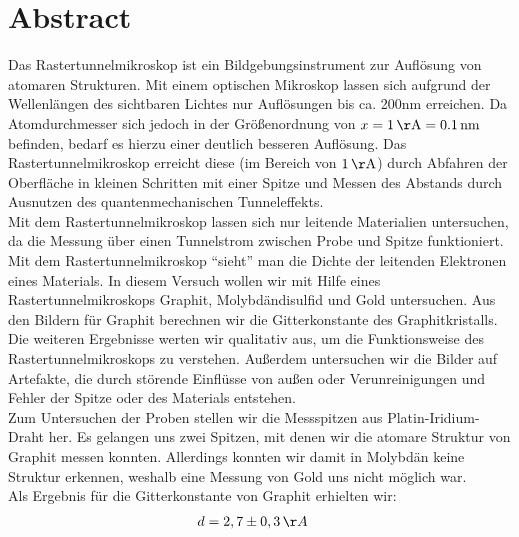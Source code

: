 \documentclass[12pt,listof=totoc]{scrartcl}
\title{\vspace{0cm}{\Huge Fortgeschrittenen-Praktikum I:\\ \vspace{1cm} Rastertunnelmikroskop}}
\author{Saskia Bondza\\Simon Stephan}
\date{durchgeführt am 07. und 10.10.2016}
\begin{document}
\maketitle
\newpage

\section*{Abstract}
Das Rastertunnelmikroskop ist ein Bildgebungsinstrument zur Auflösung von atomaren Strukturen. Mit einem optischen Mikroskop lassen sich aufgrund der Wellenlängen des sichtbaren Lichtes nur Auflösungen bis ca. 200nm erreichen. Da Atomdurchmesser sich jedoch in der Größenordnung von $x=1\,\mathrm{\AA}=0.1\,\mathrm{nm}$ befinden, bedarf es hierzu einer deutlich besseren Auflösung. Das Rastertunnelmikroskop erreicht diese (im Bereich von $1\,\mathrm{\AA}$) durch Abfahren der Oberfläche in kleinen Schritten mit einer Spitze und Messen des Abstands durch Ausnutzen des quantenmechanischen Tunneleffekts.\\

Mit dem Rastertunnelmikroskop lassen sich nur leitende Materialien untersuchen, da die Messung über einen Tunnelstrom zwischen Probe und Spitze funktioniert. Mit dem Rastertunnelmikroskop "`sieht"' man die Dichte der leitenden Elektronen eines Materials. In diesem Versuch wollen wir mit Hilfe eines Rastertunnelmikroskops Graphit, Molybdändisulfid und Gold untersuchen. Aus den Bildern für Graphit berechnen wir die Gitterkonstante des Graphitkristalls. Die weiteren Ergebnisse werten wir qualitativ aus, um die Funktionsweise des Rastertunnelmikroskops zu verstehen. Außerdem untersuchen wir die Bilder auf Artefakte, die durch störende Einflüsse von außen oder Verunreinigungen und Fehler der Spitze oder des Materials entstehen.\\

Zum Untersuchen der Proben stellen wir die Messspitzen aus Platin-Iridium-Draht her. Es gelangen uns zwei Spitzen, mit denen wir die atomare Struktur von Graphit messen konnten. Allerdings konnten wir damit in Molybdän keine Struktur erkennen, weshalb eine Messung von Gold uns nicht möglich war.\\

Als Ergebnis für die Gitterkonstante von Graphit erhielten wir:
\begin{align*}
	d&=2,7\pm0,3\,\AA
\end{align*}

\newpage
\end{document}
